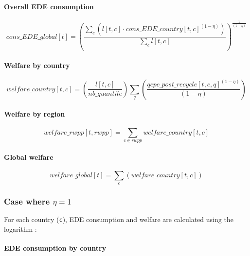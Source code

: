 \documentclass[
]{article}
\begin{document}
\paragraph{Overall EDE consumption}\label{overall-ede-consumption}

\begin{equation}
 cons\_EDE\_global[t] = \left( \frac{\sum_c (l[t,c] \cdot cons\_EDE\_country[t,c]^{(1-\eta)})}{\sum_c l[t,c]} \right)^{\frac{1}{(1-\eta)}} 
\end{equation}


\paragraph{Welfare by country}\label{welfare-by-country}

\begin{equation}
  welfare\_country[t,c] = \left( \frac{l[t,c]}{nb\_quantile} \right) \sum_q \left( \frac{qcpc\_post\_recycle[t,c,q]^{(1-\eta)}}{(1-\eta)} \right)
\end{equation}

\paragraph{Welfare by region}\label{welfare-by-region}

\begin{equation} 
  welfare\_rwpp[t,rwpp] = \sum_{c \in rwpp}welfare\_country[t,c]
\end{equation}

\paragraph{Global welfare}\label{global-welfare}

\begin{equation}
  welfare\_global[t] = \sum_c (welfare\_country[t,c])
\end{equation}

\subsubsection{\texorpdfstring{Case where
\(\eta = 1\)}{Case where \textbackslash eta = 1}}\label{case-where-eta-1}

For each country (\texttt{c}), EDE consumption and welfare are
calculated using the logarithm :

\paragraph{EDE consumption by
country}\label{ede-consumption-by-country-1}
\end{document}
